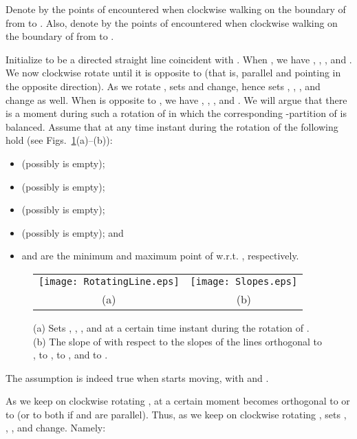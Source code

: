 \documentclass{llncs}
\renewenvironment{proof}
{{\bf Proof:}}{\hspace*{\fill}\par\vspace{2mm}}
\begin{document}
\begin{proof}
Denote by  the points of  encountered when clockwise walking on the boundary of  from  to . Also, denote by  the points of  encountered when clockwise walking on the boundary of  from  to .

Initialize  to be a directed straight line coincident with . When , we have , , , and . We now clockwise rotate  until it is opposite to  (that is, parallel and pointing in the opposite direction). As we rotate , sets  and  change, hence sets , , , and  change as well. When  is opposite to , we have , , , and . We will argue that there is a moment during such a rotation of  in which the corresponding -partition of  is balanced. Assume that at any time instant during the rotation of  the following hold (see Figs.~\ref{fig:rotating}(a)--(b)):

\begin{itemize}
\item  (possibly  is empty);
\item  (possibly  is empty);
\item  (possibly  is empty);
\item  (possibly  is empty); and
\item  and  are the minimum and maximum point of  w.r.t. , respectively.
\end{itemize}


\begin{figure}[tb]
\begin{center}
\begin{tabular}{c c}
\mbox{\texttt{[image: RotatingLine.eps]}} & \hspace{5mm}
\mbox{\texttt{[image: Slopes.eps]}}\\
(a) \hspace{5mm} & \hspace{5mm} (b)
\end{tabular}
\caption{(a) Sets , , , and  at a certain time instant during the rotation of . (b) The slope of  with respect to the slopes of the lines orthogonal to , to , to , and to .}
\label{fig:rotating}
\end{center}
\end{figure}

The assumption is indeed true when  starts moving, with  and .

As we keep on clockwise rotating , at a certain moment  becomes orthogonal to  or to  (or to both if  and  are parallel). Thus, as we keep on clockwise rotating , sets , , , and  change. Namely:


\end{proof}
\end{document}

